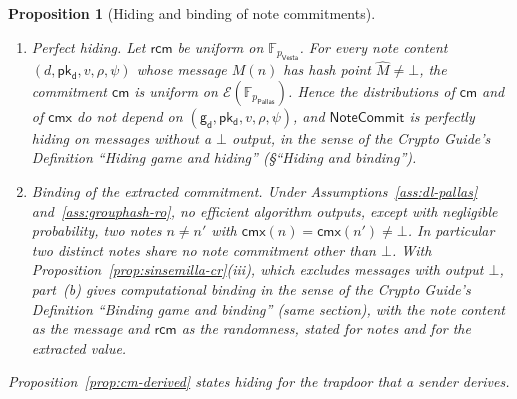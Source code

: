 \documentclass[11pt,a4paper]{article}
\newtheorem{proposition}[theorem]{Proposition}
\theoremstyle{definition}
\newcommand{\F}{\mathbb{F}}
\newcommand{\cmsym}{\mathsf{cm}}
\newcommand{\cmx}{\mathsf{cmx}}
\newcommand{\Pallas}{\ensuremath{\mathsf{Pallas}}}
\newcommand{\Vesta}{\ensuremath{\mathsf{Vesta}}}
\newcommand{\Ep}{\ensuremath{\mathcal{E}}}
\newcommand{\NoteCommit}{\ensuremath{\mathsf{NoteCommit}}}
\newcommand{\pkd}{\ensuremath{\mathsf{pk_d}}}
\newcommand{\gd}{\ensuremath{\mathsf{g_d}}}
\newcommand{\rcm}{\ensuremath{\mathsf{rcm}}}
\begin{document}
\begin{proposition}[Hiding and binding of note commitments]\label{prop:cm}
\leavevmode
\begin{enumerate}
\item[(a)] Perfect hiding. Let $\rcm$ be uniform on $\F_{p_{\Vesta}}$. For
  every note content $(d, \pkd, v, \rho, \psi)$ whose message $M(n)$ has hash
  point $\hat{M} \neq \bot$, the commitment $\cmsym$ is uniform on
  $\Ep(\F_{p_{\Pallas}})$. Hence the distributions of $\cmsym$ and of $\cmx$
  do not depend on $(\gd, \pkd, v, \rho, \psi)$, and $\NoteCommit$ is
  perfectly hiding on messages without a $\bot$ output, in the sense of the
  \emph{Crypto Guide}'s Definition ``Hiding game and hiding''
  (\S``Hiding and binding'').
\item[(b)] Binding of the extracted commitment. Under
  Assumptions~\ref{ass:dl-pallas} and~\ref{ass:grouphash-ro}, no efficient
  algorithm outputs, except with negligible probability, two notes
  $n \neq n'$ with $\cmx(n) = \cmx(n') \neq \bot$. In particular two
  distinct notes share no note commitment other than $\bot$. With
  Proposition~\ref{prop:sinsemilla-cr}(iii), which excludes messages with
  output $\bot$, part~(b) gives computational binding in the sense of the
  \emph{Crypto Guide}'s Definition ``Binding game and binding'' (same
  section), with the note content as the message and $\rcm$ as the
  randomness, stated for notes and for the extracted value.
\end{enumerate}
Proposition~\ref{prop:cm-derived} states hiding for the trapdoor that a
sender derives.
\end{proposition}
\end{document}
